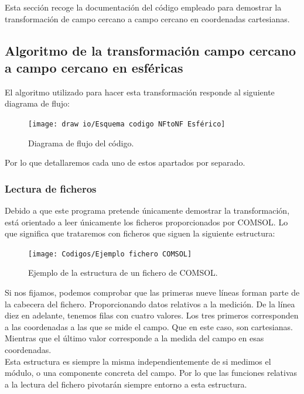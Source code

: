 \documentclass{article}
\begin{document}
Esta sección recoge la documentación del código empleado para demostrar la transformación de campo cercano a campo cercano en coordenadas cartesianas.

\newpage

\subsection{Algoritmo de la transformación campo cercano a campo cercano en esféricas}
\label{sec:documentacion codigo NFtoNF esfericas}

El algoritmo utilizado para hacer esta transformación responde al siguiente diagrama de flujo:

\begin{figure}[h]
  \centering
    \texttt{[image: draw io/Esquema codigo NFtoNF Esférico]}
    \caption{Diagrama de flujo del código.}
    \label{DWIO:NFtoNF esfericas}
\end{figure}

Por lo que detallaremos cada uno de estos apartados por separado.
\newpage
\subsubsection{Lectura de ficheros}

Debido a que este programa pretende únicamente demostrar la transformación, está orientado a leer únicamente los ficheros proporcionados por COMSOL. Lo que significa que trataremos con ficheros que siguen la siguiente estructura:

\begin{figure}[h]
  \centering
    \texttt{[image: Codigos/Ejemplo fichero COMSOL]}
    \caption{Ejemplo de la estructura de un fichero de COMSOL.}
    \label{Ejemplo fichero COMSOL}
\end{figure}

Si nos fijamos, podemos comprobar que las primeras nueve líneas forman parte de la cabecera del fichero. Proporcionando datos relativos a la medición. De la línea diez en adelante, tenemos filas con cuatro valores. Los tres primeros corresponden a las coordenadas a las que se mide el campo. Que en este caso, son cartesianas. Mientras que el último valor corresponde a la medida del campo en esas coordenadas.\\

Esta estructura es siempre la misma independientemente de si medimos el módulo, o una componente concreta del campo. Por lo que las funciones relativas a la lectura del fichero pivotarán siempre entorno a esta estructura.\\
\end{document}
